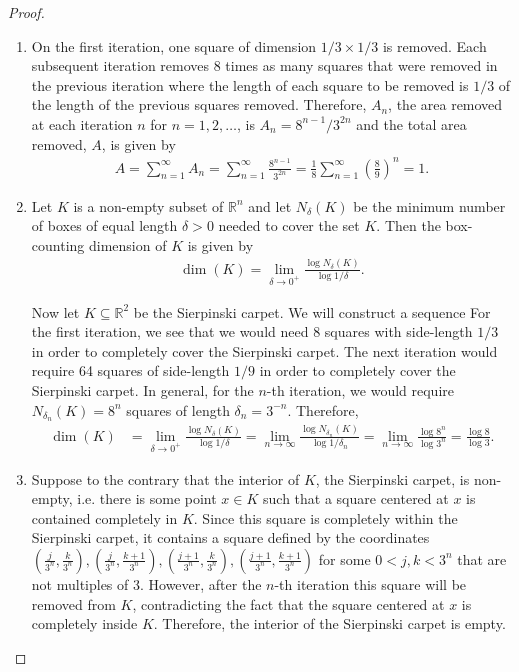 \begin{proof}
  \begin{enumerate}
    \item On the first iteration, one square of dimension $1/3 \times 1/3$ is removed.
      Each subsequent iteration removes 8 times as many squares that were removed in the previous
      iteration where the length of each square to be removed is $1/3$ of the length of the previous squares removed.
      Therefore, $A_n$, the area removed at each iteration $n$ for $n=1,2,\dots$, is $A_n = 8^{n-1}/3^{2n}$
      and the total area removed, $A$, is given by
      \begin{align*}
        A = \sum_{n=1}^\infty A_n = \sum_{n=1}^\infty \frac{8^{n-1}}{3^{2n}} = \frac{1}{8}\sum_{n=1}^\infty \left(\frac{8}{9}\right)^n = 1.
      \end{align*}

    \item Let $K$ is a non-empty subset of $\mathbb{R}^n$ and let $N_\delta(K)$ be the
      minimum number of boxes of equal length $\delta > 0$ needed to cover the set $K$.
      Then the box-counting dimension of $K$ is given by
      \begin{align*}
        \dim(K) = \lim_{\delta \to 0^+} \frac{\log N_\delta(K)}{\log 1/\delta}.
      \end{align*}

      Now let $K \subseteq \mathbb{R}^2$ be the Sierpinski carpet. We will construct a sequence
      For the first iteration, we see that we would need 8 squares with side-length $1/3$ in order to completely cover
      the Sierpinski carpet. The next iteration would require 64 squares of side-length $1/9$ in order to
      completely cover the Sierpinski carpet. In general, for the $n$-th iteration, we would require
      $N_{\delta_n}(K) = 8^n$ squares of length $\delta_n = 3^{-n}$. Therefore,
      \begin{align*}
        \dim(K) &= \lim_{\delta \to 0^+} \frac{\log N_\delta(K)}{\log 1/\delta} = \lim_{n\to\infty}\frac{\log N_{\delta_n}(K)}{\log 1/\delta_n} = \lim_{n\to\infty}\frac{\log 8^n}{\log 3^n} = \frac{\log 8}{\log 3}.
      \end{align*}

    \item Suppose to the contrary that the interior of $K$, the Sierpinski carpet,
      is non-empty, i.e. there is some point $x\in K$ such that a square centered at
      $x$ is contained completely in $K$. Since this square is completely within the Sierpinski carpet,
      it contains a square defined by the coordinates
      $\displaystyle
      \left(\frac{j}{3^n}, \frac{k}{3^n}\right),
      \left(\frac{j}{3^n}, \frac{k+1}{3^n}\right),
      \left(\frac{j+1}{3^n}, \frac{k}{3^n}\right),
      \left(\frac{j+1}{3^n}, \frac{k+1}{3^n}\right)$
      for some $0 < j,k < 3^n$ that are not multiples of 3. However, after the $n$-th iteration this square will be
      removed from $K$, contradicting the fact that the square centered at $x$ is completely inside $K$.
      Therefore, the interior of the Sierpinski carpet is empty.
  \end{enumerate}
\end{proof}
\newpage
